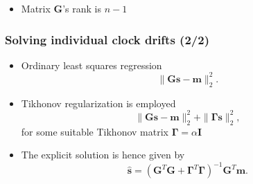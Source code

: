 \documentclass{beamer}
\begin{document}
\begin{frame}
\begin{itemize}
\item Matrix $\bm{G}$'s rank is $n-1$
\end{itemize}
\end{frame}

\begin{frame}
\frametitle{Solving individual clock drifts (2/2)}
\begin{itemize}
\item Ordinary least squares regression
\begin{equation}
\| \mathbf{Gs}-\mathbf{m} \|_2^2.
\label{eq:leastsquares}
\end{equation}

\item Tikhonov regularization is employed
\begin{equation}
\| \mathbf{Gs}-\mathbf{m} \|_2^2 + \| \bm{\Gamma}\mathbf{s} \|_2^2, 
\label{eq:tikhonov}
\end{equation}
\quad \quad for some suitable Tikhonov matrix $\bm{\Gamma} = \alpha\mathbf{I}$
\item The explicit solution is hence given by
\begin{equation}
\hat{\mathbf{s}} = (\mathbf{G}^T\mathbf{G} + \bm{\Gamma}^T\bm{\Gamma})^{-1}\mathbf{G}^T\mathbf{m}.  
\end{equation}

\end{itemize}

\end{frame}
\end{document}
